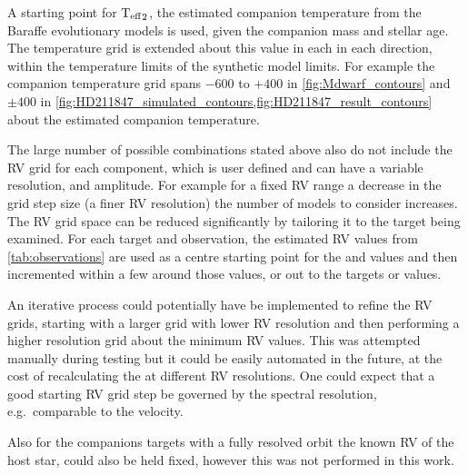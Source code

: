A starting point for \({\textrm{T}_{\mathrm{eff}}}_{2}\), the estimated companion temperature from the Baraffe evolutionary models is used, given the companion mass and stellar age.
The temperature grid is extended about this value in each in each direction, within the temperature limits of the synthetic model limits.
For example the companion temperature grid spans \(-600\) to \(+400\)\K{} in \cref{fig:Mdwarf_contours} and \(\pm400\)\K{} in \cref{fig:HD211847_simulated_contours,fig:HD211847_result_contours} about the estimated companion temperature.

The large number of possible combinations stated above also do not include the {RV} grid for each component, which is user defined and can have a variable resolution, and amplitude.
For example for a fixed {RV} range a decrease in the grid step size (a finer {RV} resolution) the number of models to consider increases.
The {RV} grid space can be reduced significantly by tailoring it to the target being examined.
For each target and observation, the estimated {RV} values from \cref{tab:observations} are used as a centre starting point for the \Rvone{} and \Rvtwo{} values and then incremented within a few {\fwhm} around those values, or out to the targets \Kone{} or \Ktwo{} values.

An iterative process could potentially have be implemented to refine the {RV} grids, starting with a larger grid with lower {RV} resolution and then performing a higher resolution grid about the minimum \textchisquared{} {RV} values.
This was attempted manually during testing but it could be easily automated in the future, at the cost of recalculating the \textchisquared{} at different {RV} resolutions.
One could expect that a good starting {RV} grid step be governed by the spectral resolution, e.g.\ comparable to the {\fwhm} velocity.

Also for the companions targets with a fully resolved orbit the known {RV} of the host star, \Rvone{} could also be held fixed, however this was not performed in this work.
